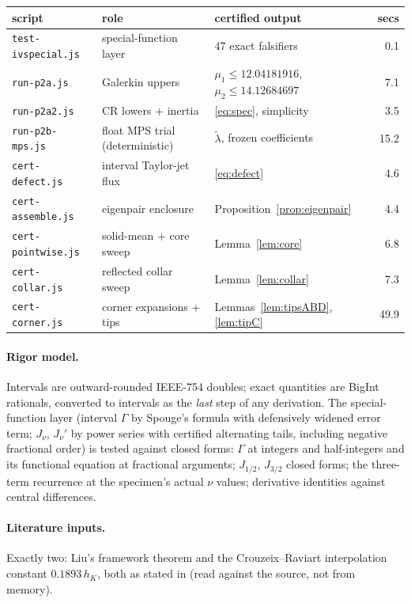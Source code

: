 \documentclass[11pt]{article}
\newcommand{\lam}{\tilde\lambda}
\begin{document}
\begin{center}
\small
\begin{tabular}{@{}lllr@{}}
\toprule
script & role & certified output & secs \\
\midrule
\texttt{test-ivspecial.js} & special-function layer & 47 exact falsifiers & 0.1 \\
\texttt{run-p2a.js}        & Galerkin uppers & $\mu_1\le12.04181916$, $\mu_2\le14.12684697$ & 7.1 \\
\texttt{run-p2a2.js}       & CR lowers + inertia & \eqref{eq:spec}, simplicity & 3.5 \\
\texttt{run-p2b-mps.js}    & float MPS trial (deterministic) & $\lam$, frozen coefficients & 15.2 \\
\texttt{cert-defect.js}    & interval Taylor-jet flux & \eqref{eq:defect} & 4.6 \\
\texttt{cert-assemble.js}  & eigenpair enclosure & Proposition~\ref{prop:eigenpair} & 4.4 \\
\texttt{cert-pointwise.js} & solid-mean + core sweep & Lemma~\ref{lem:core} & 6.8 \\
\texttt{cert-collar.js}    & reflected collar sweep & Lemma~\ref{lem:collar} & 7.3 \\
\texttt{cert-corner.js}    & corner expansions + tips & Lemmas~\ref{lem:tipsABD}, \ref{lem:tipC} & 49.9 \\
\bottomrule
\end{tabular}
\end{center}

\paragraph{Rigor model.}
Intervals are outward-rounded IEEE-754 doubles; exact quantities are
BigInt rationals, converted to intervals as the \emph{last} step of any
derivation. The special-function layer (interval $\Gamma$ by Spouge's
formula with defensively widened error term; $J_\nu$, $J_\nu'$ by power
series with certified alternating tails, including negative fractional
order) is tested against closed forms: $\Gamma$ at integers and
half-integers and its functional equation at fractional arguments;
$J_{1/2}$, $J_{3/2}$ closed forms; the three-term recurrence at the
specimen's actual $\nu$ values; derivative identities against central
differences.

\paragraph{Literature inputs.}
Exactly two: Liu's framework theorem and the Crouzeix--Raviart
interpolation constant $0.1893\,h_K$, both as stated in
\cite{YouXieLiu} (read against the source, not from memory).
\end{document}
